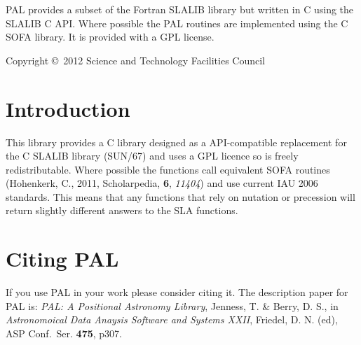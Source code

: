 \documentclass[twoside,11pt]{article}
\newcommand{\stardocinitials}  {SUN}
\newcommand{\stardoccopyright}
{Copyright \copyright\ 2012 Science and Technology Facilities Council}
\newcommand{\stardocnumber}    {267.1}
\newcommand{\stardocabstract}  {
PAL provides a subset of the Fortran SLALIB library but written in C
using the SLALIB C API. Where possible the PAL routines are
implemented using the C SOFA library. It is provided with a GPL license.
}
\newcommand{\stardocname}{\stardocinitials /\stardocnumber}
\newenvironment{latexonly}{}{}
\renewcommand{\_}{\texttt{\symbol{95}}}
\renewcommand{\thepage}{\roman{page}}
\begin{document}
\stardocabstract

\begin{latexonly}
\newpage
\vspace*{\fill}
\stardoccopyright
\end{latexonly}


\cleardoublepage
\renewcommand{\thepage}{\arabic{page}}
\setcounter{page}{1}


\section{Introduction}

This library provides a C library designed as a API-compatible
replacement for the C SLALIB library (SUN/67) and uses a GPL licence so is
freely redistributable. Where possible the functions call equivalent
SOFA routines (Hohenkerk, C., 2011, Scholarpedia, \textbf{6}, \emph{11404})
and use current IAU 2006 standards. This means that any
functions that rely on nutation or precession will return slightly
different answers to the SLA functions.

\section{Citing PAL}

If you use PAL in your work please consider citing it. The description paper
for PAL is: \emph{PAL: A Positional Astronomy Library}, Jenness, T. \& Berry, D. S.,
in \emph{Astronomoical Data Anaysis Software and Systems XXII}, Friedel, D. N. (ed),
ASP Conf.\ Ser. \textbf{475}, p307.
\end{document}
